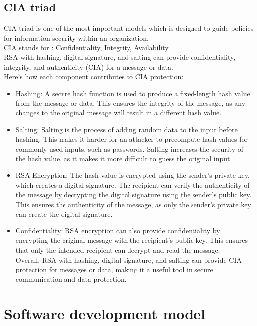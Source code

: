 \subsection{CIA triad}
CIA triad is one of the most important models which is designed to guide policies
for information security within an organization.\\
CIA stands for :
Confidentiality,
Integrity,
Availability.\\
RSA with hashing, digital signature, and salting can provide confidentiality, integrity, and authenticity (CIA) for a message or data. \\
Here's how each component contributes to CIA protection:
\begin{itemize}
	\item Hashing: A secure hash function is used to produce a fixed-length hash value from the message or data. 
	This ensures the integrity of the message, as any changes to the original message will result in a different hash value.
	\item Salting: Salting is the process of adding random data to the input before hashing. 
	This makes it harder for an attacker to precompute hash values for commonly used inputs, such as passwords. 
	Salting increases the security of the hash value, as it makes it more difficult to guess the original input.
	\item RSA Encryption: The hash value is encrypted using the sender's private key, which creates a digital signature. 
	The recipient can verify the authenticity of the message by decrypting the digital signature using the sender's public key.
	This ensures the authenticity of the message, as only the sender's private key can create the digital signature.
\item Confidentiality: RSA encryption can also provide confidentiality by encrypting the original message with the recipient's public key. 
This ensures that only the intended recipient can decrypt and read the message.\\

Overall, RSA with hashing, digital signature, and salting can provide CIA protection for messages or data, making it a useful tool in secure communication and data protection.
\end{itemize}






\pagebreak
\section{Software development model}

